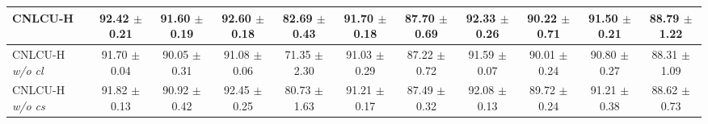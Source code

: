 \documentclass[11pt]{article}
\begin{document}
\begin{table}[!htbp]
\begin{tabular}{l |cc|cc|cc|cc|cc}
			\hline
			CNLCU-H & \makecell{92.42\\ $\pm$\scriptsize{0.21}} & \makecell{91.60\\ $\pm$\scriptsize{0.19}} &  \makecell{92.60\\ $\pm$\scriptsize{0.18}} & \makecell{82.69\\ $\pm$\scriptsize{0.43}} & \makecell{91.70\\ $\pm$\scriptsize{0.18}} & \makecell{87.70\\ $\pm$\scriptsize{0.69}} & \makecell{92.33\\ $\pm$\scriptsize{0.26}} & \makecell{90.22\\ $\pm$\scriptsize{0.71}} & \makecell{91.50\\ $\pm$\scriptsize{0.21}} & \makecell{88.79\\ $\pm$\scriptsize{1.22}}\\	\hline
			CNLCU-H \textit{w/o cl} & \makecell{91.70\\ $\pm$\scriptsize{0.04}}	& \makecell{90.05\\ $\pm$\scriptsize{0.31}} & \makecell{91.08\\ $\pm$\scriptsize{0.06}} & \makecell{71.35\\ $\pm$\scriptsize{2.30}} & \makecell{91.03\\ $\pm$\scriptsize{0.29}} & \makecell{87.22\\ $\pm$\scriptsize{0.72}} & \makecell{91.59\\ $\pm$\scriptsize{0.07}} & \makecell{90.01\\ $\pm$\scriptsize{0.24}} & \makecell{90.80\\ $\pm$\scriptsize{0.27}} & \makecell{88.31\\ $\pm$\scriptsize{1.09}}\\	  \hline
			CNLCU-H \textit{w/o cs} & \makecell{91.82\\ $\pm$\scriptsize{0.13}} & \makecell{90.92\\ $\pm$\scriptsize{0.42}} & \makecell{92.45\\ $\pm$\scriptsize{0.25}} & \makecell{80.73\\ $\pm$\scriptsize{1.63}} & \makecell{91.21\\ $\pm$\scriptsize{0.17}} & \makecell{87.49\\ $\pm$\scriptsize{0.32}} & \makecell{92.08\\ $\pm$\scriptsize{0.13}} & \makecell{89.72\\ $\pm$\scriptsize{0.24}} & \makecell{91.21\\ $\pm$\scriptsize{0.38}} & \makecell{88.62\\ $\pm$\scriptsize{0.73}}\\	  \hline

\end{tabular}
\end{table}
\end{document}
